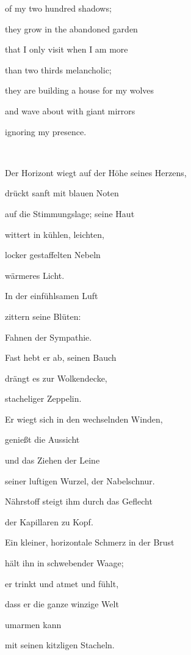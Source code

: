 of my two hundred shadows;

they grow in the abandoned garden

that I only visit when I am more

than two thirds melancholic;

they are building a house for my wolves 

and wave about with giant mirrors

ignoring my presence.

~



\bigskip


\bigskip

Der Horizont wiegt auf der Höhe seines Herzens,

drückt sanft mit blauen Noten 

auf die Stimmungslage; seine Haut 

wittert in kühlen, leichten,

locker gestaffelten Nebeln

wärmeres Licht. 


\bigskip

In der einfühlsamen Luft \ \ 

zittern seine Blüten: 

Fahnen der Sympathie.

Fast hebt er ab, seinen Bauch

drängt es zur Wolkendecke,

stacheliger Zeppelin.


\bigskip

Er wiegt sich in den wechselnden Winden, 

genießt die Aussicht

und das Ziehen der Leine 

seiner luftigen Wurzel, der Nabelschnur.

Nährstoff steigt ihm durch das Geflecht 

der Kapillaren zu Kopf.


\bigskip

Ein kleiner, horizontale Schmerz in der Brust

hält ihn in schwebender Waage;

er trinkt und atmet und fühlt, 

dass er die ganze winzige Welt 

umarmen kann

mit seinen kitzligen Stacheln.



